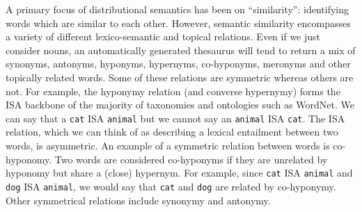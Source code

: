 \documentclass[11pt]{article}
\begin{document}
A primary focus of distributional semantics has been on ``similarity'': identifying words which are similar to each other. However, semantic similarity encompasses a variety of different lexico-semantic and topical relations.  Even if we just consider nouns, an automatically generated thesaurus will tend to return a mix of synonyms, antonyms, hyponyms, hypernyms, co-hyponyms, meronyms and other topically related words.  Some of these relations are symmetric whereas others are not.  For example, the hyponymy relation (and converse hypernymy) forms the ISA backbone of the majority of taxonomies and ontologies such as WordNet.  We can say that a \texttt{cat} ISA \texttt{animal}  but we cannot say an \texttt{animal} ISA \texttt{cat}.  The ISA relation, which we can think of  as describing a lexical entailment \cite{Geffet2005}  between two words, is asymmetric. An example of a symmetric relation between words is co-hyponomy. Two words are considered co-hyponyms if they are unrelated by hyponomy but share a (close) hypernym.  For example, since \texttt{cat} ISA \texttt{animal} and \texttt{dog} ISA \texttt{animal}, we would say that \texttt{cat} and \texttt{dog} are related by co-hyponymy.  Other symmetrical relations include synonymy and antonymy. 
\end{document}
